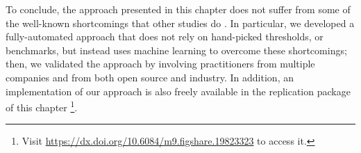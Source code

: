 
To conclude, the approach presented in this chapter does not suffer from some of the well-known shortcomings that other studies do \cite{Khomyakov2020}.
In particular, we developed a fully-automated approach that does not rely on hand-picked thresholds, or benchmarks, but instead uses machine learning to overcome these shortcomings; then, we validated the approach by involving practitioners from multiple companies and from both open source and industry.
In addition, an implementation of our approach is also freely available in the replication package of this chapter \footnote{Visit \url{https://dx.doi.org/10.6084/m9.figshare.19823323} to access it.}.


